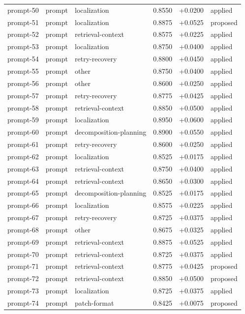 \begin{center}
\begin{longtable}{llp{5.2cm}rrl}
prompt-50 & prompt & localization & 0.8550 & +0.0200 & applied \\
prompt-51 & prompt & localization & 0.8875 & +0.0525 & proposed \\
prompt-52 & prompt & retrieval-context & 0.8575 & +0.0225 & applied \\
prompt-53 & prompt & localization & 0.8750 & +0.0400 & applied \\
prompt-54 & prompt & retry-recovery & 0.8800 & +0.0450 & applied \\
prompt-55 & prompt & other & 0.8750 & +0.0400 & applied \\
prompt-56 & prompt & other & 0.8600 & +0.0250 & applied \\
prompt-57 & prompt & retry-recovery & 0.8775 & +0.0425 & applied \\
prompt-58 & prompt & retrieval-context & 0.8850 & +0.0500 & applied \\
prompt-59 & prompt & localization & 0.8950 & +0.0600 & applied \\
prompt-60 & prompt & decomposition-planning & 0.8900 & +0.0550 & applied \\
prompt-61 & prompt & retry-recovery & 0.8600 & +0.0250 & applied \\
prompt-62 & prompt & localization & 0.8525 & +0.0175 & applied \\
prompt-63 & prompt & retrieval-context & 0.8750 & +0.0400 & applied \\
prompt-64 & prompt & retrieval-context & 0.8650 & +0.0300 & applied \\
prompt-65 & prompt & decomposition-planning & 0.8525 & +0.0175 & applied \\
prompt-66 & prompt & localization & 0.8575 & +0.0225 & applied \\
prompt-67 & prompt & retry-recovery & 0.8725 & +0.0375 & applied \\
prompt-68 & prompt & other & 0.8675 & +0.0325 & applied \\
prompt-69 & prompt & retrieval-context & 0.8875 & +0.0525 & applied \\
prompt-70 & prompt & retrieval-context & 0.8725 & +0.0375 & applied \\
prompt-71 & prompt & retrieval-context & 0.8775 & +0.0425 & proposed \\
prompt-72 & prompt & retrieval-context & 0.8850 & +0.0500 & proposed \\
prompt-73 & prompt & localization & 0.8725 & +0.0375 & applied \\
prompt-74 & prompt & patch-format & 0.8425 & +0.0075 & proposed \\

\end{longtable}
\end{center}
